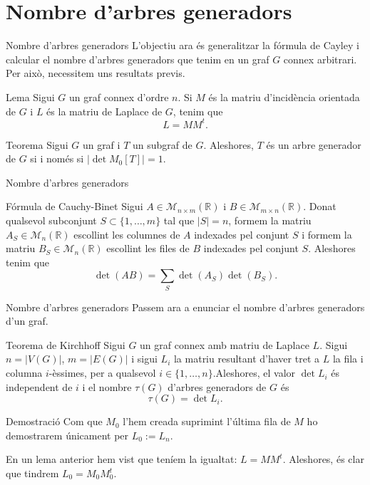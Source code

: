 \documentclass{beamer}
\begin{document}
\section{Nombre d'arbres generadors}
\begin{frame}{Nombre d'arbres generadors}
    L'objectiu ara és generalitzar la fórmula de Cayley i calcular el nombre d'arbres generadors que tenim en un graf $G$ connex arbitrari. Per això, necessitem uns resultats previs.
    \pause
    \begin{block}{Lema}
    Sigui $G$ un graf connex d'ordre $n$. Si $M$ és la matriu d'incidència orientada de $G$ i $L$ és la matriu de Laplace de $G$, tenim que $$L=MM^t.$$
    \end{block}\pause
    \begin{alertblock}{Teorema}
    Sigui $G$ un graf i $T$ un subgraf de $G$. Aleshores, $T$ és un arbre generador de $G$ si i només si $|\det M_0[T]|=1$.
    \end{alertblock}
\end{frame}
\begin{frame}{Nombre d'arbres generadors}
    \begin{alertblock}{Fórmula de Cauchy-Binet}
    Sigui $A\in\mathcal{M}_{n\times m}(\mathbb{R})$ i $B\in\mathcal{M}_{m\times n}(\mathbb{R})$. Donat qualsevol subconjunt $S\subset\{1,\ldots,m\}$ tal que $|S|=n$, formem la matriu $A_S\in\mathcal{M}_n(\mathbb{R})$ escollint les columnes de $A$ indexades pel conjunt $S$ i formem la matriu $B_S\in\mathcal{M}_n(\mathbb{R})$ escollint les files de $B$ indexades pel conjunt $S$. Aleshores tenim que $$\det(AB)=\sum_S\det(A_S)\det(B_S).$$
    \end{alertblock}
\end{frame}
\begin{frame}{Nombre d'arbres generadors}
    Passem ara a enunciar el nombre d'arbres generadors d'un graf.\pause
    \begin{alertblock}{Teorema de Kirchhoff}
    Sigui $G$ un graf connex amb matriu de Laplace $L$. Sigui $n=|V(G)|$, $m=|E(G)|$ i sigui $L_i$ la matriu resultant d'haver tret a $L$ la fila i columna $i$-èssimes, per a qualsevol $i\in\{1,\ldots,n\}$.\pause\space Aleshores, el valor $\det L_i$ és independent de $i$ i el nombre $\tau(G)$ d'arbres generadors de $G$ és $$\tau(G)=\det L_i.$$
    \end{alertblock}\pause
    \begin{block}{Demostració}
    Com que $M_0$ l'hem creada suprimint l'última fila de $M$ ho demostrarem únicament per $L_0:=L_n$.\pause\par En un lema anterior hem vist que teníem la igualtat: $L=MM^t$. Aleshores, és clar que tindrem $L_0=M_0M_0^t$.
    \end{block}
\end{frame}
\end{document}
